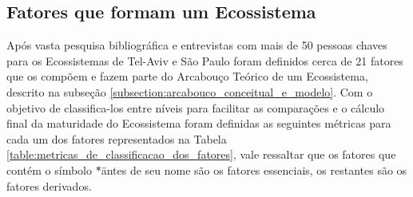 \subsection{Fatores que formam um Ecossistema}
\label{subsection:fatores_que_formam_um_ecossistema}

Após vasta pesquisa bibliográfica e entrevistas com mais de 50 pessoas chaves para os Ecossistemas de Tel-Aviv e São Paulo foram definidos cerca de 21 fatores que os compõem e fazem parte do Arcabouço Teórico de um Ecossistema, descrito na subseção \ref{subsection:arcabouco_conceitual_e_modelo}. Com o objetivo de classifica-los entre níveis para facilitar as comparações e o cálculo final da maturidade do Ecossistema foram definidas as seguintes métricas para cada um dos fatores representados na Tabela \ref{table:metricas_de_classificacao_dos_fatores}, vale ressaltar que os fatores que contém o símbolo \"*\" antes de seu nome são os fatores essenciais, os restantes são os fatores derivados.

